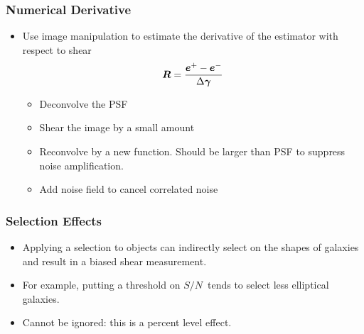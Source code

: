 \documentclass{beamer}
\newcommand{\mcalR}{\mbox{\boldmath $R$}}
\newcommand{\vecg}{\mbox{\boldmath $\gamma$}}
\newcommand{\vest}{\mbox{\boldmath $e$}}
\newcommand{\snr}{$S/N$}
\begin{document}
\frame
{
 
    \frametitle{Numerical Derivative}

       \begin{itemize}

        \item Use image manipulation to estimate the derivative of the
            estimator with respect to shear
            {\color{gold}
                \begin{equation}
                    \mcalR = \frac{\vest^+ - \vest^-}{\Delta \vecg} \nonumber 
                \end{equation}
            }
            \begin{itemize}
                \item Deconvolve the PSF
                \item Shear the image by a small amount
                \item Reconvolve by a new function.  Should be larger than PSF to suppress
                    noise amplification. 
                \item {\color{lightsteelblue} Add noise field to cancel correlated noise}
            \end{itemize}


    \end{itemize}

}



\frame
{
    \frametitle{Selection Effects}

 

    \begin{itemize}

        \item  Applying a selection to objects can indirectly select on the shapes
            of galaxies and result in a biased shear measurement.

        \item For example, putting a threshold on \snr\ tends to select less
            elliptical galaxies.

        \item Cannot be ignored: this is a percent level effect.

    \end{itemize}

}
\end{document}
